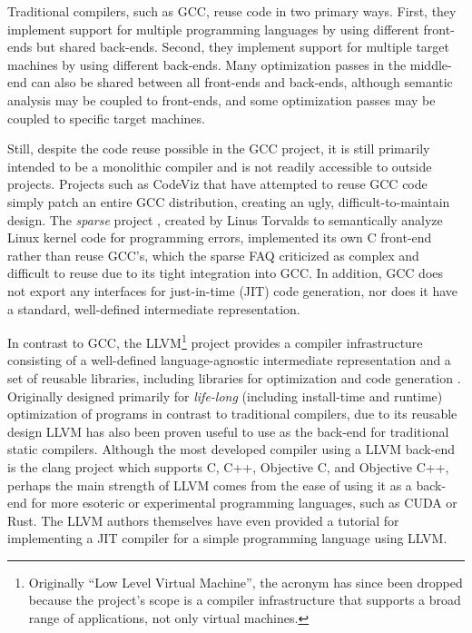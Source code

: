 \documentclass[11pt]{article}
\begin{document}
Traditional compilers, such as GCC, reuse code in two primary ways.  First, they
implement support for multiple programming languages by using different
front-ends but shared back-ends.  Second, they implement support for multiple
target machines by using different back-ends.  Many optimization passes in the
middle-end can also be shared between all front-ends and back-ends, although
semantic analysis may be coupled to front-ends, and some optimization passes may
be coupled to specific target machines.

Still, despite the code reuse possible in the GCC project, it is still primarily
intended to be a monolithic compiler and is not readily accessible to outside
projects.  Projects such as CodeViz \cite{codeviz} that have attempted to reuse
GCC code simply patch an entire GCC distribution, creating an ugly,
difficult-to-maintain design.  The {\em sparse} project \cite{sparse}, created
by Linus Torvalds to semantically analyze Linux kernel code for programming
errors, implemented its own C front-end rather than reuse GCC's, which the
sparse FAQ criticized as complex and difficult to reuse due to its tight
integration into GCC.  In addition, GCC does not export any interfaces for
just-in-time (JIT) code generation, nor does it have a standard, well-defined
intermediate representation.

In contrast to GCC, the LLVM\footnote{Originally ``Low Level Virtual Machine'',
the acronym has since been dropped because the project's scope is a compiler
infrastructure that supports a broad range of applications, not only virtual
machines.} project provides a compiler infrastructure consisting of a
well-defined language-agnostic intermediate representation and a set of reusable
libraries, including libraries for optimization and code generation
\cite{lattner2004llvm}.  Originally designed primarily for {\em life-long}
(including install-time and runtime) optimization of programs in contrast to
traditional compilers, due to its reusable design LLVM has also been proven
useful to use as the back-end for traditional static compilers.  Although the
most developed compiler using a LLVM back-end is the clang project which
supports C, C++, Objective C, and Objective C++, perhaps the main strength of
LLVM comes from the ease of using it as a back-end for more esoteric or
experimental programming languages, such as CUDA\cite{nvidia_llvm} or
Rust\cite{rust}.  The LLVM authors themselves have even provided a tutorial for
implementing a JIT compiler for a simple programming language using
LLVM\cite{kaleidoscope}.
\end{document}
